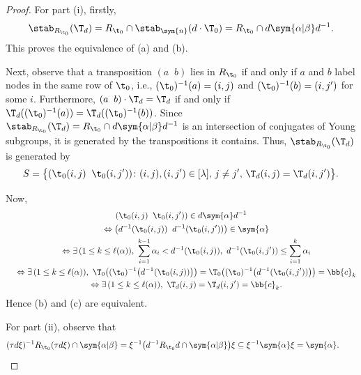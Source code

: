 \begin{proof} For part (i), firstly,
\begin{gather*}
\stab_{R_{\t_0}} (\T_d) = R_{\t_0} \cap \stab_{\sym{n}} (d \cdot \T_0) = R_{\t_0} \cap d \sym{\alpha|\beta} d^{-1}.
\end{gather*}
This proves the equivalence of (a) and (b).

Next, observe that a transposition $(a \;\; b)$ lies in $R_{\t_0}$ if and only if $a$ and $b$ label nodes in the same row of $\t_0$, i.e., $(\t_0)^{-1}(a) = (i,j)$ and $(\t_0)^{-1}(b) = (i,j')$ for some $i$. Furthermore, $(a \;\; b) \cdot \T_d = \T_d$ if and only if $\T_d((\t_0)^{-1}(a)) = \T_d((\t_0)^{-1}(b))$.
Since $\stab_{R_{\t_0}} (\T_d) = R_{\t_0} \cap d \sym{\alpha|\beta} d^{-1}$ is an intersection of conjugates of Young subgroups, it is generated by the transpositions it contains. Thus, $\stab_{R_{\t_0}} (\T_d)$ is generated by
\begin{gather*}
S = \big\{ (\t_0(i,j) \;\; \t_0(i,j')) \colon(i,j),(i,j') \in [\lambda],\, j \ne j',\, \T_d(i,j) = \T_d(i,j') \big\}.
\end{gather*}

Now,
\begin{gather*}
 (\t_0(i,j) \;\; \t_0(i,j')) \in d\sym{\alpha} d^{-1} \\
\quad {} \Leftrightarrow \big( d^{-1}(\t_0(i,j)) \;\; d^{-1}(\t_0(i,j'))\big) \in \sym{\alpha} \\
\quad {}\Leftrightarrow \exists\, (1 \leq k \leq \ell(\alpha)), \
\sum_{i=1}^{k-1} \alpha_i < d^{-1}(\t_0(i,j)), \ d^{-1}(\t_0(i,j')) \leq \sum_{i=1}^{k} \alpha_i\\
\quad {}\Leftrightarrow \exists\, (1 \leq k \leq \ell(\alpha)), \ \T_0 \big((\t_0)^{-1} \big(d^{-1}(\t_0(i,j))\big)\big) = \T_0 \big((\t_0)^{-1} \big( d^{-1}(\t_0(i,j'))\big)\big) = \bb{c}_k \\
\quad {} \Leftrightarrow \exists\, (1 \leq k \leq \ell(\alpha)), \ \T_d (i,j) = \T_d (i,j') = \bb{c}_k .
\end{gather*}
Hence (b) and (c) are equivalent.

For part (ii), observe that
\begin{gather*}
(\tau d \xi)^{-1} R_{\t_0} (\tau d \xi) \cap \sym{\alpha|\beta} = \xi^{-1}\big(d^{-1}R_{\t_0}d\cap \sym{\alpha|\beta}\big)\xi \subseteq
\xi^{-1}\sym{\alpha}\xi = \sym{\alpha}.\tag*{\qed}
\end{gather*}\renewcommand{\qed}{}
\end{proof}

